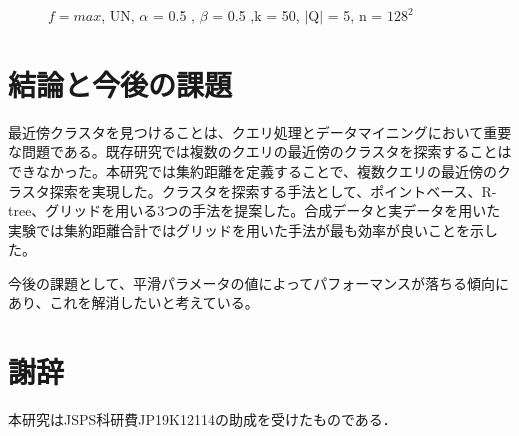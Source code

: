 \documentclass{deimj}
\begin{document}
\begin{figure}[H]
	\centering
    \caption{$f=max$, UN, $\alpha$ = 0.5 , $\beta$ = 0.5 ,k = 50, $\mid$Q$\mid$ = 5, n = $128^2$}
    \label{fig:max-dataSize}
\end{figure}

\section{結論と今後の課題}
最近傍クラスタを見つけることは、クエリ処理とデータマイニングにおいて重要な問題である。既存研究では複数のクエリの最近傍のクラスタを探索することはできなかった。本研究では集約距離を定義することで、複数クエリの最近傍のクラスタ探索を実現した。クラスタを探索する手法として、ポイントベース、R-tree、グリッドを用いる3つの手法を提案した。合成データと実データを用いた実験では集約距離合計ではグリッドを用いた手法が最も効率が良いことを示した。

今後の課題として、平滑パラメータの値によってパフォーマンスが落ちる傾向にあり、これを解消したいと考えている。

\section*{謝辞}
本研究はJSPS科研費JP19K12114の助成を受けたものである．

\vspace{2em}

\end{document}

